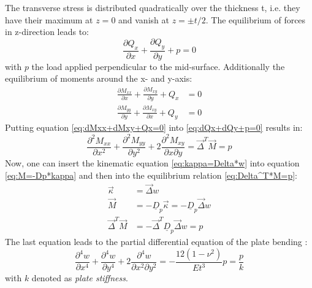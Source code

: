   The transverse stress is distributed quadratically over the thickness t, i.e. they have their maximum at $z=0$ and vanish at $z = \pm t/2$. The equilibrium of forces in z-direction leads to:
  \begin{equation}\label{eq:dQx+dQy+p=0}
  \frac{\partial Q_x}{\partial x} + \frac{\partial Q_y}{\partial y} + p = 0
  \end{equation}
  with $p$ the load applied perpendicular to the mid-surface. Additionally the equilibrium of moments around the x- and y-axis:\\
  \begin{align}\label{eq:dMxx+dMxy+Qx=0}
  \frac{\partial M_{xx}}{\partial x} + \frac{\partial M_{xy}}{\partial y} + Q_x &= 0 \nonumber\\
  \frac{\partial M_{yy}}{\partial y} + \frac{\partial M_{xy}}{\partial x} + Q_y &= 0
  \end{align}
  Putting equation \eqref{eq:dMxx+dMxy+Qx=0} into \eqref{eq:dQx+dQy+p=0} results in:
  \begin{equation}\label{eq:Delta^T*M=p}
  \frac{\partial^2 M_{xx}}{\partial x^2} + \frac{\partial^2 M_{yy}}{\partial y^2} + 2\frac{\partial^2 M_{xy}}{\partial x\partial y} = \vec{\Delta}^T \vec{M} = p
  \end{equation}
  Now, one can insert the kinematic equation \eqref{eq:kappa=Delta*w} into equation \eqref{eq:M=-Dp*kappa} and then into the equilibrium relation \eqref{eq:Delta^T*M=p}:
  \begin{align}
  \vec{\kappa} &= \vec{\Delta}w \nonumber\\
  \vec{M} &= -\underline{D}_p \vec{\kappa} = -\underline{D}_p \vec{\Delta} w \nonumber\\
  \vec{\Delta}^T \vec{M} &= -\vec{\Delta}^T \underline{D}_p \vec{\Delta} w = p
  \end{align}
  The last equation leads to the partial differential equation of the plate bending \cite{klein2013fem}:
  \begin{equation}
  \frac{\partial^4 w}{\partial x^4} + \frac{\partial^4 w}{\partial y^4} + 2\frac{\partial^4 w}{\partial x^2 \partial y^2} = -\frac{12(1-\nu^2)}{E t^3} p = \frac{p}{k}
  \end{equation}
  with $k$ denoted as \textit{plate stiffness}.
  
